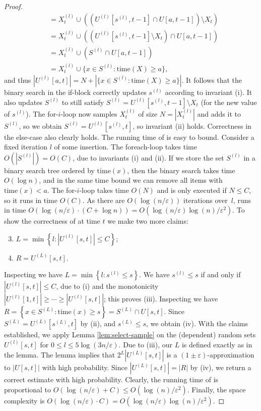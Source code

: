 \documentclass[11pt]{article}
\def\set#1{\left\{ #1 \right\}}
\def\card#1{\left\lvert #1 \right\rvert}		%
\newcommand{\eps}{\varepsilon}
\begin{document}
\begin{proof}
\begin{align*}
        &= X_t^{(l)} \cup ((U^{(l)}[s^{(l)}, t-1] \cap U[a, t-1]) \setminus X_t) \\
        &= X_t^{(l)} \cup ((U^{(l)}[s^{(l)}, t-1] \setminus X_t) \cap U[a, t-1]) \\
        &= X_t^{(l)} \cup (S^{(l)} \cap U[a,t-1])  \\
        &= X_t^{(l)} \cup \{x \in S^{(l)} \colon \mathrm{time}(X) \ge a \},
    \end{align*}
    and thus $|U^{(l)}[a,t]| = N + |\{x \in S^{(l)} \colon \mathrm{time}(X) \ge a \}|$. It follows that the binary search in the if-block correctly updates $s^{(l)}$ according to invariant (i). It also updates $S^{(l)}$ to still satisfy $S^{(l)} = U^{(l)}[s^{(l)}, t-1] \setminus X_t$ (for the new value of $s^{(l)}$). The for-$i$-loop now samples $X_t^{(l)}$ of size $N = |X_t^{(l)}|$ and adds it to $S^{(l)}$, so we obtain $S^{(l)} = U^{(l)}[s^{(l)}, t]$, so invariant (ii) holds. Correctness in the else-case also clearly holds.
%
    The running time of \ins is easy to bound.
    Consider a fixed iteration $l$ of some insertion. The foreach-loop takes time $O(|S^{(l)}|) = O(C)$, due to invariants (i) and (ii). 
    If we store the set $S^{(l)}$ in a binary search tree ordered by $\mathrm{time}(x)$, then the binary search takes time $O(\log n)$, and in the same time bound we can remove all items with $\mathrm{time}(x) < a$.
    The for-$i$-loop takes time $O(N)$ and is only executed if $N \le C$, so it runs in time $O(C)$.
    As there are $O(\log(n/\eps))$ iterations over~$l$, \ins runs in time $O(\log(n/\eps) \cdot (C + \log n)) = O(\log(n/\eps) \log(n)/\eps^2)$.
%
    \smallskip
    To show the correctness of  at time $t$ we make two more claims:
    \begin{enumerate}[label={(\roman*)}]
        \setcounter{enumi}{2}
        \item $L = \min \set{ l : \card{U^{(l)}[s,t]} \leq C }$;
        \item $R = U^{(L)}[s,t]$.
    \end{enumerate}
    Inspecting  we have $L = \min \set{l : s^{(l)} \leq s}$. We have $s^{(l)} \leq s$ if and only if $\card{U^{(l)}[s,t]} \leq C$, due to (i) and the monotonicity $\card{U^{(l)}[1,t]} \geq \cdots \geq \card{U^{(l)}[s,t]}$; this proves (iii). Inspecting  we have $R = \set{x \in S^{(L)} : \mathrm{time}(x) \geq s } = S^{(L)} \cap U[s,t]$. Since $S^{(L)} = U^{(L)}[s^{(L)},t]$ by (ii), and $s^{(L)} \leq s$, we obtain (iv).
%
    With the claims established, we apply Lemma \ref{lem:select-sample} on the (dependent) random sets $U^{(l)}[s,t]$ for $0 \le l \le 5 \log(3n/\eps)$. Due to (iii), our $L$ is defined exactly as in the lemma. The lemma implies that $2^L |U^{(L)}[s,t]|$ is a $(1 \pm \eps)$-approximation to $\card{U[s,t]}$ with high probability. Since $|U^{(L)}[s,t]| = |R|$ by (iv), we return a correct estimate with high probability.
%
    Clearly, the running time of \est is proportional to $O(\log(n/\eps) + C) \leq O(\log(n)/\eps^2)$.
%
    Finally, the space complexity is $O(\log(n/\eps) \cdot C) = O(\log(n/\eps) \log(n)/\eps^2 )$.
\end{proof}
\end{document}
